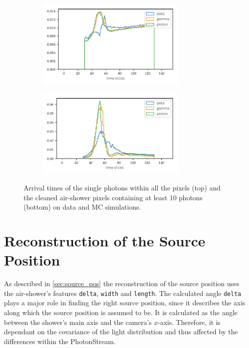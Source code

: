 \begin{figure}
  \begin{subfigure}{\textwidth}
    \centering
    \includegraphics[width=0.8\textwidth]{Plots/all_slices_min_0_per_pixel.pdf}
  \end{subfigure}
  \begin{subfigure}{\textwidth}
    \centering
    \includegraphics[width=0.8\textwidth]{Plots/all_slices_min_10_per_pixel.pdf}
  \end{subfigure}
  \caption{Arrival times of the single photons within all the pixels (top) and the cleaned air-shower pixels containing at least 10 photons (bottom) on data and MC simulations.}
  \label{fig:slices}
\end{figure}

\section{Reconstruction of the Source Position}
%
As described in \autoref{sec:source_pos} the reconstruction of the source
position uses the air-shower's features \texttt{delta}, \texttt{width} and
\texttt{length}. The calculated angle \texttt{delta} plays a major role in
finding the right source position, since it describes the axis along which
the source position is assumed to be. It is calculated as the angle between
the shower's main axis and the camera's $x$-axis. Therefore, it is dependant
on the covariance of the light distribution and thus affected by the
differences within the PhotonStream.

